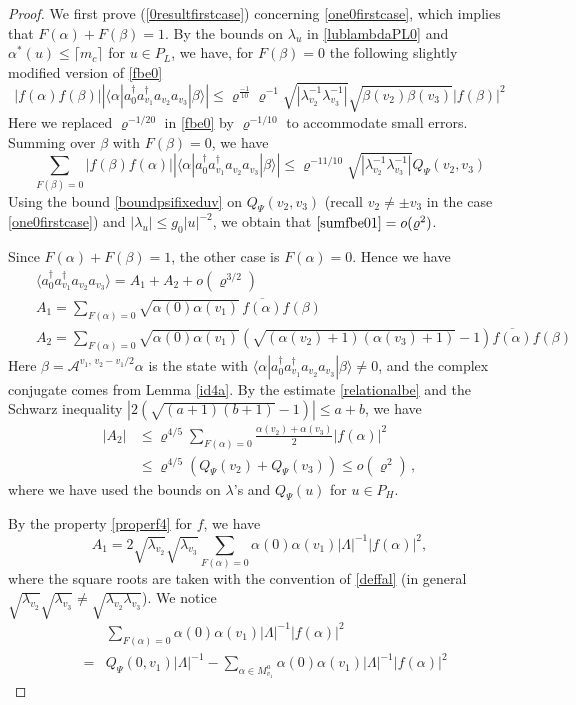 \documentclass[11pt]{article}
\numberwithin{equation}{section}
\newcommand{\beq}{\begin{equation}}
\newcommand{\eeq}{\end{equation}}
\newcommand{\beqa}{\begin{eqnarray}}
\newcommand{\eeqa}{\end{eqnarray}}
\newcommand\al{{\alpha}}
\newcommand\be{\beta}
\renewcommand\rho\varrho
\theoremstyle{definition}
\begin{document}
 \begin{proof} 
 We first  prove (\ref{0resultfirstcase}) concerning  \eqref{one0firstcase}, which implies that 
 $F(\alpha)+ F(\beta)=1$.   By the bounds on $\lambda_u$ in \eqref{lublambdaPL0} and $\al^*(u)\leq \lceil m_c\rceil$ for $u\in P_L$, we have, for $ F(\be)=0$  the following slightly modified version  of  \eqref{fbe0} 
 \beq\label{fbe0dup1}
 |f(\al)f(\be)|\left|\langle \al| a^\dagger_{0}a^\dagger_{v_1}a_{v_2}a_{v_3}|\be\rangle\right|\leq\rho^{\frac{-1}{10}} \rho^{-1}\sqrt{\left|\lambda_{v_2}^{-1}\lambda_{v_3}^{-1}\right|}\sqrt{\be(v_2)\be(v_3)}|f(\be)|^2
 \eeq
Here we replaced  $\rho^{-1/20}$ in \eqref{fbe0} by $\rho^{-1/10}$ to accommodate small errors. 
Summing over $\beta$ with $F(\be)=0$, we have 
\beq\label{sumfbe01}
\sum_{F(\be)=0}|f(\be)f(\al)|\left|\langle \al| a^\dagger_{0}a^\dagger_{v_1}a_{v_2}a_{v_3}|\be\rangle\right|\leq \rho^{-11/10}\sqrt{\left|\lambda_{v_2}^{-1}\lambda_{v_3}^{-1}\right|}Q_\Psi(v_2,v_3)
\eeq
Using the bound \eqref{boundpsifixeduv} on $Q_\Psi(v_2,v_3)$ (recall $v_2\neq\pm v_3$ in the case \eqref{one0firstcase})  and $|\lambda_u|\leq g_0|u|^{-2}$, we obtain that $\eqref{sumfbe01}=o(\rho^2)$. 

Since $F(\alpha)+ F(\beta)=1$, the other case is $F(\alpha)=0$.  
Hence we have 
\beqa\label{temp8.96}
&&\langle  a^\dagger_{0}a^\dagger_{v_1}a_{v_2}a_{v_3}\rangle= A_{1}+ A_{2}+ o(\rho^{3/2})\\\nonumber
&&A_{1} = \sum_{F(\al)=0}\sqrt{\al(0)\al(v_1)}\,\overline{f(\al)}f(\be)\\\nonumber
&&A_{2} = \sum_{F(\al)=0}\sqrt{\al(0)\al(v_1)}\left(\sqrt{(\al(v_2)+1)(\al(v_3)+1)}-1\right)\overline{f(\al)}f(\be)
\eeqa
Here $\be=\mathcal A^{v_1,\,v_2-v_1/2}\al$ is the state with $\langle \al| a^\dagger_{0}a^\dagger_{v_1}a_{v_2}a_{v_3}|\be\rangle\neq0$, and the complex conjugate comes from Lemma \ref{id4a}.
By the estimate  \eqref{relationalbe} and the Schwarz inequality 
$ | 2 (\sqrt{(a+1)(b+1)}-1)|\leq a+b$, we  have 
\begin{align}\label{temp8.100}
|A_{2}| & \le \rho^{4/5}\sum_{F(\al)=0} \frac {\al(v_2)+\al(v_3)}  2 |f(\al)|^2 \\
& \leq  \rho^{4/5}(Q_\Psi(v_2)+Q_\Psi(v_3)) \leq o(\rho^2)\, , 
\end{align}
where we have used the bounds on $\lambda$'s and $Q_\Psi(u)$ for $u\in P_H$. 

By the property  \eqref{properf4} for $f$, we have 
\beq
A_{1}= 2 \sqrt{\lambda_{v_2}}\sqrt{\lambda_{v_3}}\sum_{F(\al)=0}\al(0)\al(v_1)|\Lambda|^{-1}|f(\al)|^2,
\eeq
where the square roots are taken with the convention of \eqref{deffal} (in general $\sqrt{\lambda_{v_2}}\sqrt{\lambda_{v_3}}\neq\sqrt{\lambda_{v_2}\lambda_{v_3}}$).
We notice 
\beqa\nonumber
&&\sum_{F(\al)=0}\al(0)\al(v_1)|\Lambda|^{-1}|f(\al)|^2\\
&=&Q_{\Psi}(0,v_1)|\Lambda|^{-1}-\sum_{\al\in M_{v_1}^a}\al(0)\al(v_1)|\Lambda|^{-1}|f(\al)|^2
\eeqa



\end{proof}
\end{document}
